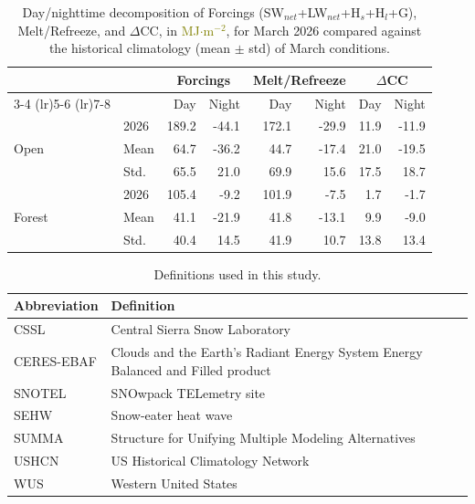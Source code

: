 \documentclass[draft]{agujournal2019}
\newcommand{\hlat}{\textcolor{black}{H$_l$}\xspace}
\newcommand{\mjmtwo}{\textcolor{olive}{MJ$\cdot$m$^{-2}$}\xspace}
\begin{document}
\begin{table}[h]
\centering
\caption{Day/nighttime decomposition of Forcings (SW$_{net}$+LW$_{net}$+H$_s$+H$_l$+G), Melt/Refreeze, and $\Delta$CC, in \mjmtwo, for March 2026 compared against the historical climatology (mean $\pm$ std) of March conditions.}
\label{tab:forest_open_diel_summary}
\begin{tabular}{llrrrrrr}
\toprule
 & & \multicolumn{2}{c}{Forcings} & \multicolumn{2}{c}{Melt/Refreeze} & \multicolumn{2}{c}{$\Delta$CC} \\
\cmidrule(lr){3-4} \cmidrule(lr){5-6} \cmidrule(lr){7-8}
 & & Day & Night & Day & Night & Day & Night \\
\midrule
\multirow{3}{*}{Open}   & 2026 & 189.2 & -44.1 & 172.1 & -29.9 & 11.9 & -11.9 \\
 & Mean & 64.7 & -36.2 & 44.7 & -17.4 & 21.0 & -19.5 \\
 & Std. & 65.5 & 21.0 & 69.9 & 15.6 & 17.5 & 18.7 \\
\midrule
\multirow{3}{*}{Forest} & 2026 & 105.4 & -9.2 & 101.9 & -7.5 & 1.7 & -1.7 \\
 & Mean & 41.1 & -21.9 & 41.8 & -13.1 & 9.9 & -9.0 \\
 & Std. & 40.4 & 14.5 & 41.9 & 10.7 & 13.8 & 13.4 \\ 
\bottomrule
\end{tabular}
\end{table}




\begin{table}[h]
\centering
\caption{Definitions used in this study.}
\label{tab:definitions}
\begin{tabular}{ll}
\toprule
Abbreviation & Definition \\
\midrule
CSSL         & Central Sierra Snow Laboratory \\
CERES-EBAF   & Clouds and the Earth's Radiant Energy System Energy Balanced and Filled product \\
SNOTEL       & SNOwpack TELemetry site \\
SEHW         & Snow-eater heat wave \\
SUMMA        & Structure for Unifying Multiple Modeling Alternatives \\
USHCN        & US Historical Climatology Network \\
WUS          & Western United States \\
\bottomrule
\end{tabular}
\end{table}




\clearpage

\end{document}
